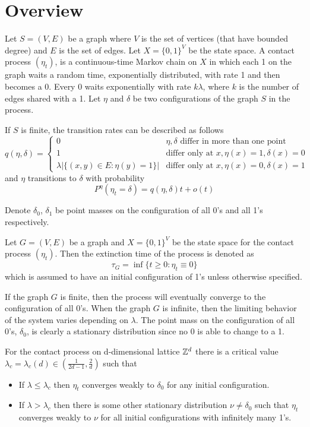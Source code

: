 
\section{Overview}
\begin{defn}
Let $S = (V,E)$ be a graph where $V$ is the set of vertices (that have bounded degree) and $E$ is the set of edges.
Let $X =  \{0,1\}^V$ be the state space.
A contact process $(\eta_t)$, is a continuous-time Markov chain on $X$ in which each 1 on the graph waits a random time, exponentially distributed, with rate 1 and then becomes a 0.
Every 0 waits exponentially with rate $k \lambda$, where $k$ is the number of edges shared with a 1.
Let $\eta$ and $\delta$ be two configurations of the graph $S$ in the process.

If $S$ is finite, the transition rates can be described as follows
$$
q(\eta, \delta) = \begin{cases}
    0 & \eta, \delta \text{ differ in more than one point}\\
    1 & \text{differ only at } x, \eta(x) = 1, \delta(x) = 0\\
    \lambda |\{ (x,y) \in E : \eta(y) = 1\}| & \text{differ only at } x, \eta(x) = 0, \delta(x) = 1
\end{cases}
$$
and $\eta$ transitions to $\delta$ with probability
$$
P^\eta(\eta_t = \delta) = q(\eta, \delta) t + o(t)
$$

Denote $\delta_0$, $\delta_1$ be point masses on the configuration of all 0's and all 1's respectively.
\end{defn}

\begin{defn}
Let $G = (V,E)$ be a graph and $X = \{0,1\}^V$ be the state space for the contact process $(\eta_t)$.
Then the extinction time of the process is denoted as
$$
\tau_{G} = \inf\{ t \geq 0 : \eta_t \equiv 0 \}
$$
which is assumed to have an initial configuration of 1's unless otherwise specified.
\end{defn}

If the graph $G$ is finite, then the process will eventually converge to the configuration of all 0's.
When the graph $G$ is infinite, then the limiting behavior of the system varies depending on $\lambda$.
The point mass on the configuration of all 0's, $\delta_0$, is clearly a stationary distribution since no 0 is able to change to a 1.

\begin{theorem} \cite{Liggett2002}
For the contact process on d-dimensional lattice $\mathbb{Z}^d$ there is a critical value $\lambda_c = \lambda_c(d) \in \left( \frac{1}{2d - 1}, \frac{2}{d} \right)$ such that
\begin{itemize}
    \item If $\lambda \leq \lambda_c$ then $\eta_t$ converges weakly to $\delta_0$ for any initial configuration.
    \item If $\lambda > \lambda_c$ then there is some other stationary distribution $\nu \not = \delta_0$ such that $\eta_t$ converges weakly to $\nu$ for all initial configurations with infinitely many 1's.
\end{itemize}
\end{theorem}

